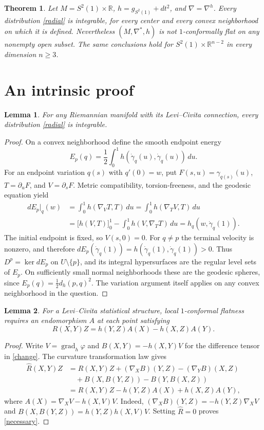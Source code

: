 \documentclass[11pt]{article}
\newtheorem{theorem}{Theorem}
\newtheorem{lemma}{Lemma}
\newcommand{\R}{\mathbb R}
\newcommand{\grad}{\operatorname{grad}}
\begin{document}
\begin{theorem}\label{main}
Let $M=S^2(1)\times\R$, $h=g_{S^2(1)}+dt^2$, and
$\nabla=\nabla^h$. Every distribution \eqref{radial} is integrable,
for every center and every convex neighborhood on which it is defined.
Nevertheless $(M,\nabla^*,h)$ is not $1$-conformally flat on any nonempty
open subset. The same conclusions hold for
$S^2(1)\times\R^{n-2}$ in every dimension $n\geq3$.
\end{theorem}

\section{An intrinsic proof}
\begin{lemma}\label{energy}
For any Riemannian manifold with its Levi--Civita connection, every
distribution \eqref{radial} is integrable.
\end{lemma}
\begin{proof}
On a convex neighborhood define the smooth endpoint energy
\[
E_p(q)=\frac12\int_0^1 h(\dot\gamma_q(u),\dot\gamma_q(u))\,du.
\]
For an endpoint variation $q(s)$ with $q'(0)=w$, put
$F(s,u)=\gamma_{q(s)}(u)$, $T=\partial_uF$, and $V=\partial_sF$.
Metric compatibility, torsion-freeness, and the geodesic equation yield
\begin{align*}
dE_p|_q(w)
 &=\int_0^1h(\nabla_VT,T)\,du
 =\int_0^1h(\nabla_TV,T)\,du\\
 &=\bigl[h(V,T)\bigr]_0^1-\int_0^1h(V,\nabla_TT)\,du
 =h_q(w,\dot\gamma_q(1)).
\end{align*}
The initial endpoint is fixed, so $V(s,0)=0$. For $q\ne p$ the terminal
velocity is nonzero, and therefore
$dE_p(\dot\gamma_q(1))=h(\dot\gamma_q(1),\dot\gamma_q(1))>0$.
Thus $D^p=\ker dE_p$ on $U\setminus\{p\}$, and its integral
hypersurfaces are the regular level sets of $E_p$. On sufficiently small
normal neighborhoods these are the geodesic spheres, since
$E_p(q)=\tfrac12 d_h(p,q)^2$. The variation argument itself applies
on any convex neighborhood in the question.
\end{proof}

\begin{lemma}\label{obstruction}
For a Levi--Civita statistical structure, local $1$-conformal flatness
requires an endomorphism $A$ at each point satisfying
\begin{equation}\label{necessary}
R(X,Y)Z=h(Y,Z)A(X)-h(X,Z)A(Y).
\end{equation}
\end{lemma}
\begin{proof}
Write $V=\grad_h\varphi$ and $B(X,Y)=-h(X,Y)V$ for the difference
tensor in \eqref{change}. The curvature transformation law gives
\begin{align*}
\widehat R(X,Y)Z
 &=R(X,Y)Z+(\nabla_XB)(Y,Z)-(\nabla_YB)(X,Z)\\
 &\hspace{1em}+B(X,B(Y,Z))-B(Y,B(X,Z))\\
 &=R(X,Y)Z-h(Y,Z)A(X)+h(X,Z)A(Y),
\end{align*}
where $A(X)=\nabla_XV-h(X,V)V$. Indeed,
$(\nabla_XB)(Y,Z)=-h(Y,Z)\nabla_XV$ and
$B(X,B(Y,Z))=h(Y,Z)h(X,V)V$.
Setting $\widehat R=0$ proves \eqref{necessary}.
\end{proof}
\end{document}
